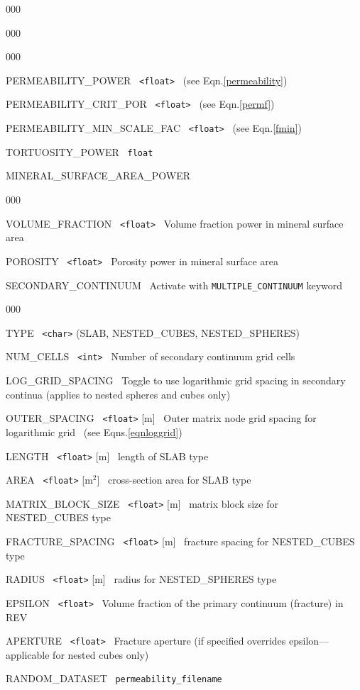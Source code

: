 \documentclass[12pt]{article}
\begin{document}
\begin{deflist}{000}
\begin{deflist}{000}
\begin{deflist}{000}
\end{deflist}
\item[\keyend]
\item[PERMEABILITY\_POWER] \ {\tt <float>} \ (see Eqn.\eqref{permeability})
\item[PERMEABILITY\_CRIT\_POR] \ {\tt <float>} \ (see Eqn.\eqref{permf})
\item[PERMEABILITY\_MIN\_SCALE\_FAC] \ {\tt <float>} \ (see Eqn.\eqref{fmin})
\item[TORTUOSITY\_POWER] \ {\tt float}
\item[MINERAL\_SURFACE\_AREA\_POWER] ~
\begin{deflist}{000}
\item[VOLUME\_FRACTION] \ {\tt <float>} \ Volume fraction power in mineral surface area
\item[POROSITY] \ {\tt <float>} \ Porosity power in mineral surface area
\end{deflist}
\item[SECONDARY\_CONTINUUM] \ Activate with {\tt MULTIPLE\_CONTINUUM} keyword 
\begin{deflist}{000}
\item[TYPE] \ {\tt <char>} (SLAB, NESTED\_CUBES, NESTED\_SPHERES)
\item[NUM\_CELLS] \ {\tt <int>} \ Number of secondary continuum grid cells
\item[LOG\_GRID\_SPACING] \ Toggle to use logarithmic grid spacing in secondary continua (applies to nested spheres and cubes only)
\item[OUTER\_SPACING] \ {\tt <float>} [m] \ Outer matrix node grid spacing for logarithmic grid \ (see Eqns.\eqref{eqnloggrid})
\item[LENGTH] \ {\tt <float>} [m] \ length of SLAB type
\item[AREA] \ {\tt <float>} [m$^2$] \ cross-section area for SLAB type
\item[MATRIX\_BLOCK\_SIZE] \ {\tt <float>} [m] \ matrix block size for NESTED\_CUBES type
\item[FRACTURE\_SPACING] \ {\tt <float>} [m] \ fracture spacing for NESTED\_CUBES type
\item[RADIUS] \ {\tt <float>} [m] \ radius for NESTED\_SPHERES type
\item[EPSILON] \ {\tt <float>} \ Volume fraction of the primary continuum (fracture) in REV
\item[APERTURE] \ {\tt <float>} \ Fracture aperture (if specified overrides epsilon---applicable for nested cubes only)
\end{deflist}
\item[\keyend]
\item[RANDOM\_DATASET] \ {\tt permeability\_filename}
\end{deflist}
\item[\keyend]
\end{deflist}
\end{document}
